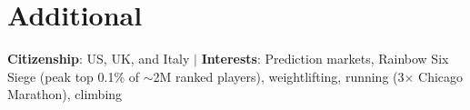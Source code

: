 \documentclass[letterpaper,10pt]{article}
\begin{document}
\section{Additional}
 \begin{itemize}[leftmargin=0.015in, label={}]
    \small{\item{
     \textbf{Citizenship}{: US, UK, and Italy} $|$ \textbf{Interests}{: Prediction markets, Rainbow Six Siege (peak top 0.1\% of $\sim$2M ranked players), weightlifting, running (3$\times$ Chicago Marathon), climbing}
    }}
 \end{itemize}
\end{document}
